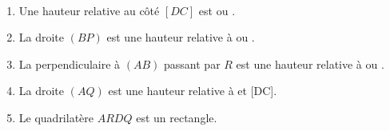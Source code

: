   \ \\ [-5mm]
  \begin{enumerate}
      \item Une hauteur relative au côté $[DC]$ est {\blue [DR]} ou {\blue [QA]}.
      \item La droite $(BP)$ est une hauteur relative à {\blue [AD]} ou {\blue [BC]}.
      \item La perpendiculaire à $(AB)$ passant par $R$ est une hauteur relative à {\blue [AB]} ou {\blue [DC]}.
      \item La droite $(AQ)$ est une hauteur relative à {\blue [AB] et [DC]}.
      \item Le quadrilatère $ARDQ$ est un {\blue rectangle}.
   \end{enumerate}
